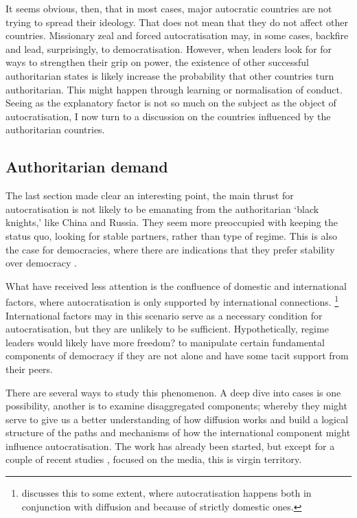 It seems obvious, then, that in most cases, major autocratic countries are not trying to spread their ideology. That does not mean that they do not affect other countries. Missionary zeal and forced autocratisation may, in some cases, backfire \citep[p. 470]{delcour_spoiler_2015} and lead, surprisingly, to democratisation. However, when leaders look for for ways to strengthen their grip on power, the existence of other successful authoritarian states is likely increase the probability that other countries turn authoritarian. This might happen through learning or normalisation of conduct. Seeing as the explanatory factor is not so much on the subject as the object of autocratisation, I now turn to a discussion on the countries influenced by the authoritarian countries.

\subsection{Authoritarian demand}
The last section made clear an interesting point, the main thrust for autocratisation is not likely to be emanating from the authoritarian `black knights,' like China and Russia. They seem more preoccupied with keeping the status quo, looking for stable partners, rather than type of regime. This is also the case for democracies, where there are indications that they prefer stability over democracy \citep{hassan_undermining_2015, risse_democracy_2015}.

What have received less attention is the confluence of domestic and international factors, where autocratisation is only supported by international connections. \footnote{\citet{buzogany_illiberal_2017} discusses this to some extent, where autocratisation happens both in conjunction with diffusion and because of strictly domestic ones.} International factors may in this scenario serve as a necessary condition for autocratisation, but they are unlikely to be sufficient. Hypothetically, regime leaders would likely have more freedom? to manipulate certain fundamental components of democracy if they are not alone and have some tacit support from their peers. 

There are several ways to study this phenomenon. A deep dive into cases is one possibility, another is to examine disaggregated components; whereby they might serve to give us a better understanding of how diffusion works and build a logical structure of the paths and mechanisms of how the international component might influence autocratisation. The work has already been started, but except for a couple of recent studies \citep{gamso_is_2021, toettoe_foreign_2023}, focused on the media, this is virgin territory. 

